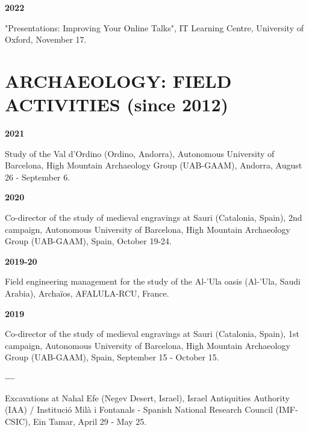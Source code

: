 \documentclass{article}
\newcommand{\fr}[1]{}       %
\newcommand{\en}[1]{#1}     %
\begin{document}
\textbf{2022 }
\fr{"Presentations: Improving your online talks", IT Learning Centre, University of Oxford, 17 Novembre.}
\en{"Presentations: Improving Your Online Talks", IT Learning Centre, University of Oxford, November 17.}
\smallbreak


\section{\fr{ARCHÉOLOGIE: ACTIVITÉS DE TERRAIN (depuis 2012)}\en{ARCHAEOLOGY: FIELD ACTIVITIES (since 2012)}}

\textbf{2021}
\fr{Étude du Val d'Ordino (Ordino, Andorre), Universitat Autònoma de Barcelona, Grup d'Arqueologia de l'Alta Muntanya (UAB-GAAM), Andorre, 26 août-6 septembre.}
\en{Study of the Val d'Ordino (Ordino, Andorra), Autonomous University of Barcelona, High Mountain Archaeology Group (UAB-GAAM), Andorra, August 26 - September 6.}

\smallbreak
\textbf{2020}
\fr{Co-responsable de l'étude des gravures médiévales de Sauri (Catalogne, Espagne), 2ème campagne, Universitat Autònoma de Barcelona, Grup d'Arqueologia de l'Alta Muntanya (UAB-GAAM), Espagne, 19 octobre-24 octobre.}
\en{Co-director of the study of medieval engravings at Sauri (Catalonia, Spain), 2nd campaign, Autonomous University of Barcelona, High Mountain Archaeology Group (UAB-GAAM), Spain, October 19-24.}

\smallbreak
\textbf{2019-20}
\fr{Gestion de l'ingénierie de terrain pour l'étude de l'oasis d'Al-'Ula (Al-'Ula, Arabie saoudite), Archaïos, AFALULA-RCU, France.}
\en{Field engineering management for the study of the Al-'Ula oasis (Al-'Ula, Saudi Arabia), Archaïos, AFALULA-RCU, France.}

\smallbreak
\textbf{2019}
\fr{Co-responsable de l'étude des gravures médiévales de Sauri (Catalogne, Espagne), 1ère campagne, Universitat Autònoma de Barcelona, Grup d'Arqueologia de l'Alta Muntanya (UAB-GAAM), Espagne, 15 septembre-15 octobre.}
\en{Co-director of the study of medieval engravings at Sauri (Catalonia, Spain), 1st campaign, Autonomous University of Barcelona, High Mountain Archaeology Group (UAB-GAAM), Spain, September 15 - October 15.}

\smallbreak
\textbf{--- }
\fr{Fouilles de Nahal Efe (désert du Néguev, Israël), Autorités des Antiquités d'Israël (IAA) / Institució Milà i Fontanals - Consejo Superior de Investigaciones Científicas (IMF-CSIC), Ein Tamar, 29 avril-25 mai.}
\en{Excavations at Nahal Efe (Negev Desert, Israel), Israel Antiquities Authority (IAA) / Institució Milà i Fontanals - Spanish National Research Council (IMF-CSIC), Ein Tamar, April 29 - May 25.}
\end{document}
